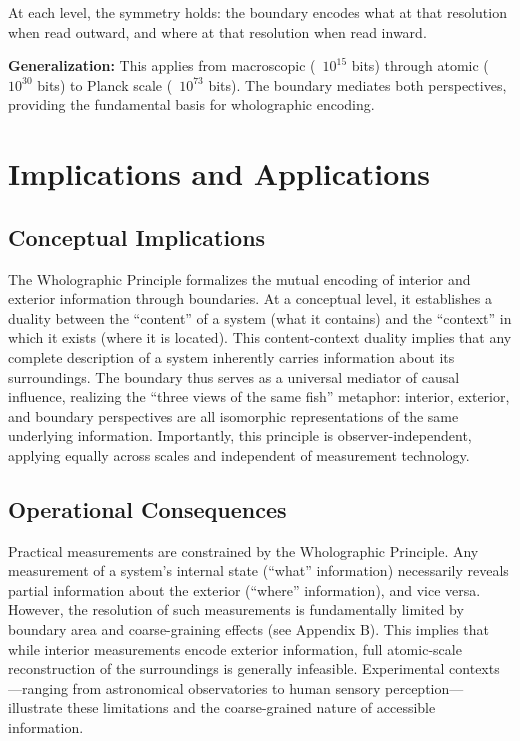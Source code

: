 ﻿\documentclass[12pt]{article}
\begin{document}
At each level, the symmetry holds: the boundary encodes what at that resolution when read outward, and where at that resolution when read inward.


\textbf{Generalization:} This applies from macroscopic (~$10^{15}$ bits) through atomic (~$10^{30}$ bits) to Planck scale (~$10^{73}$ bits). The boundary mediates both perspectives, providing the fundamental basis for wholographic encoding.


\section{Implications and Applications}


\subsection{Conceptual Implications}
The Wholographic Principle formalizes the mutual encoding of interior and exterior information through boundaries. At a conceptual level, it establishes a duality between the ``content'' of a system (what it contains) and the ``context'' in which it exists (where it is located). This content-context duality implies that any complete description of a system inherently carries information about its surroundings. The boundary thus serves as a universal mediator of causal influence, realizing the ``three views of the same fish'' metaphor: interior, exterior, and boundary perspectives are all isomorphic representations of the same underlying information. Importantly, this principle is observer-independent, applying equally across scales and independent of measurement technology.


\subsection{Operational Consequences}
Practical measurements are constrained by the Wholographic Principle. Any measurement of a system's internal state (``what'' information) necessarily reveals partial information about the exterior (``where'' information), and vice versa. However, the resolution of such measurements is fundamentally limited by boundary area and coarse-graining effects (see Appendix B). This implies that while interior measurements encode exterior information, full atomic-scale reconstruction of the surroundings is generally infeasible. Experimental contexts—ranging from astronomical observatories to human sensory perception—illustrate these limitations and the coarse-grained nature of accessible information.
\end{document}
